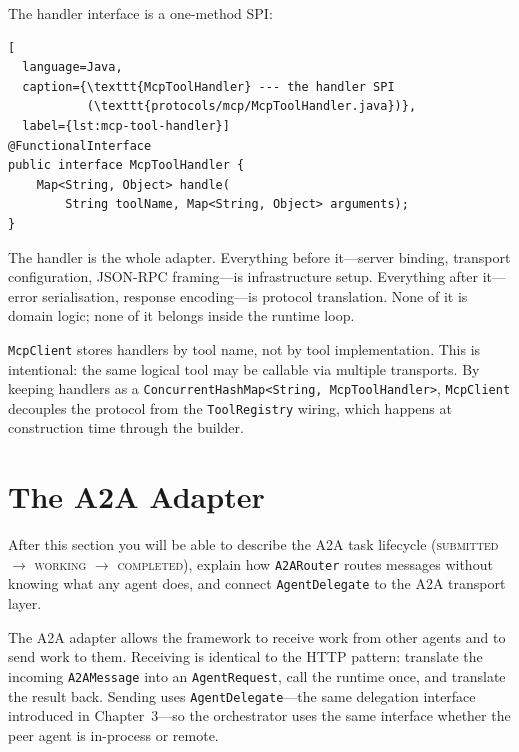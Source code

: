 The handler interface is a one-method SPI:

\begin{lstlisting}[
  language=Java,
  caption={\texttt{McpToolHandler} --- the handler SPI
           (\texttt{protocols/mcp/McpToolHandler.java})},
  label={lst:mcp-tool-handler}]
@FunctionalInterface
public interface McpToolHandler {
    Map<String, Object> handle(
        String toolName, Map<String, Object> arguments);
}
\end{lstlisting}

The handler is the whole adapter.  Everything before
it---server binding, transport configuration, JSON-RPC
framing---is infrastructure setup.  Everything after
it---error serialisation, response encoding---is protocol
translation.  None of it is domain logic; none of it belongs inside
the runtime loop.

\begin{notebox}
\lstinline{McpClient} stores handlers by tool name, not by tool
implementation.  This is intentional: the same logical tool may be
callable via multiple transports.  By keeping handlers as a
\lstinline{ConcurrentHashMap<String, McpToolHandler>},
\lstinline{McpClient} decouples the protocol from the
\lstinline{ToolRegistry} wiring, which happens at construction time
through the builder.
\end{notebox}

\section{The A2A Adapter}
\label{sec:a2a-adapter}

\begin{learningbox}
After this section you will be able to describe the A2A task
lifecycle (\textsc{submitted} $\to$ \textsc{working} $\to$
\textsc{completed}), explain how \lstinline{A2ARouter} routes
messages without knowing what any agent does, and connect
\lstinline{AgentDelegate} to the A2A transport layer.
\end{learningbox}

The A2A adapter allows the framework to receive work from other
agents and to send work to them.  Receiving is identical to the HTTP
pattern: translate the incoming \lstinline{A2AMessage} into an
\lstinline{AgentRequest}, call the runtime once, and translate the
result back.  Sending uses \lstinline{AgentDelegate}---the same
delegation interface introduced in Chapter~3---so the orchestrator
uses the same interface whether the peer agent is in-process or
remote.

